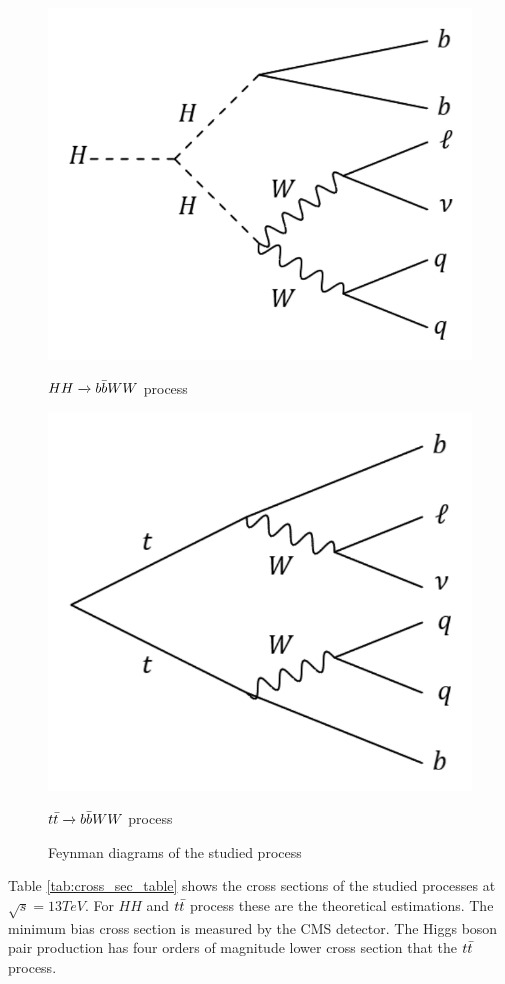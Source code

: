 \documentclass[../../main.tex]{subfiles}
\begin{document}
\begin{figure}[ht] 
  \label{ fig7} 
  \begin{minipage}[b]{0.5\linewidth}
    \centering
    \includegraphics[width=.75\linewidth]{sections/05/Images/hh.pdf}
    
    \caption*{$HH \xrightarrow{} b \Bar{b}WW$ process} 
    \vspace{4ex}
  \end{minipage}%
  \begin{minipage}[b]{0.5\linewidth}
    \centering
    \includegraphics[width=.75\linewidth]{sections/05/Images/ttbar.pdf} 
    \caption*{$ t \Bar{t} \xrightarrow{} b \Bar{b}WW$ process} 
    \vspace{4ex}
  \end{minipage} 
  \caption{Feynman diagrams of the studied process} 
\end{figure}

Table \ref{tab:cross_sec_table} shows the cross sections of the studied processes at $\sqrt{s} = 13 TeV$. For $HH$ and $t\Bar {t}$ process these are the theoretical estimations. The minimum bias cross section is measured by the CMS detector. The Higgs boson pair production has four orders of magnitude lower cross section that the $t\Bar {t}$ process.
\end{document}
